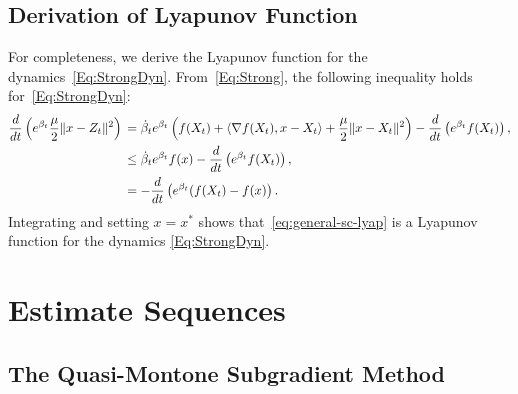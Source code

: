 \documentclass[11pt]{article}
\theoremstyle{plain}
\begin{document}
\subsection{Derivation of Lyapunov Function}
For completeness, we derive the Lyapunov function for the dynamics~\eqref{Eq:StrongDyn}. From~\eqref{Eq:Strong}, the following inequality holds for~\eqref{Eq:StrongDyn}:
\begin{align*}
\frac{d}{dt}\left(e^{\beta_t}\frac{\mu}{2} \|x - Z_t\|^2\right)\, &=  \dot \beta_t e^{\beta_t}\left( f(X_t) + \langle \nabla f(X_t), x - X_t \rangle+ \frac{\mu}{2} \|x - X_t\|^2\right)   -  \frac{d}{dt}\left( e^{ \beta_t}  f(X_t)\right),\notag \\
&\leq \dot \beta_t e^{\beta_t} f(x) -  \frac{d}{dt}\left( e^{ \beta_t}  f(X_t)\right),\notag \\
& = -\frac{d}{dt} \left(e^{\beta_t}(f(X_t) - f(x)\right).
\end{align*}
Integrating and setting $x = x^\ast$ shows that~\eqref{eq:general-sc-lyap} is a Lyapunov function for the dynamics \eqref{Eq:StrongDyn}.
\section{Estimate Sequences}
\label{App:EstSeq}
\subsection{The Quasi-Montone Subgradient Method}
\end{document}
